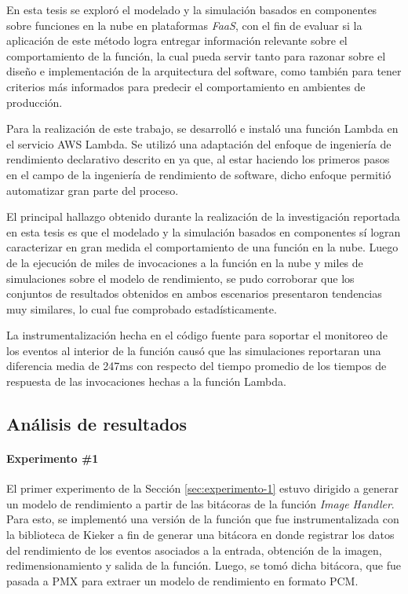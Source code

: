 En esta tesis se exploró el modelado y la simulación basados en componentes sobre funciones en la nube en plataformas \emph{FaaS}, con el fin de evaluar si la aplicación de este método logra entregar información relevante sobre el comportamiento de la función, la cual pueda servir tanto para razonar sobre el diseño e implementación de la arquitectura del software, como también para tener criterios más informados para predecir el comportamiento en ambientes de producción.

Para la realización de este trabajo, se desarrolló e instaló una función Lambda en el servicio AWS Lambda.  Se utilizó una adaptación del enfoque de ingeniería de rendimiento declarativo descrito en \cite{Walter:2018:TDP:3185768.3185777} ya que, al estar haciendo los primeros pasos en el campo de la ingeniería de rendimiento de software, dicho enfoque permitió automatizar gran parte del proceso.

El principal hallazgo obtenido durante la realización de la investigación reportada en esta tesis es que el modelado y la simulación basados en componentes sí logran caracterizar en gran medida el comportamiento de una función en la nube. Luego de la ejecución de miles de invocaciones a la función en la nube y miles de simulaciones sobre el modelo de rendimiento, se pudo corroborar que los conjuntos de resultados obtenidos en ambos escenarios presentaron tendencias muy similares, lo cual fue comprobado estadísticamente. 

La instrumentalización hecha en el código fuente para soportar el monitoreo de los eventos al interior de la función causó que las simulaciones reportaran una diferencia media de 247ms con respecto del tiempo promedio de los tiempos de respuesta de las invocaciones hechas a la función Lambda.

\subsection{Análisis de resultados}
\paragraph{Experimento \#1} El primer experimento de la Sección \ref{sec:experimento-1} estuvo dirigido a generar un modelo de rendimiento a partir de las bitácoras de la función \emph{Image Handler}. Para esto, se implementó una versión de la función que fue instrumentalizada con la biblioteca de Kieker a fin de generar una bitácora en donde registrar los datos del rendimiento de los eventos asociados a la entrada, obtención de la imagen, redimensionamiento y salida de la función. Luego, se tomó dicha bitácora, que fue pasada a PMX para extraer un modelo de rendimiento en formato PCM. 

